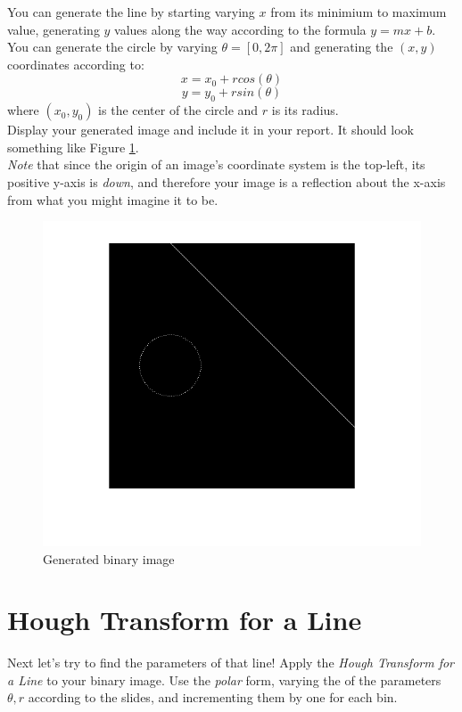 \documentclass[12pt]{article}
\begin{document}
\noindent
You can generate the line by starting varying $x$ from its minimium to maximum value, generating $y$ values along the way according to the formula $y=mx+b$.\\

\noindent
You can generate the circle by varying $\theta =[0,2\pi]$ and generating the $(x,y)$ coordinates according to:
$$x =x_0 + rcos\left(\theta\right)$$
$$y=y_0 + rsin\left(\theta\right)$$
where $(x_0,y_0)$ is the center of the circle and $r$ is its radius.\\

\noindent
Display your generated image and include it in your report.  It should look something like Figure \ref{fig1}.\\ 

\noindent
 \emph{Note} that since the origin of an image's coordinate system is the top-left, its positive y-axis is \emph{down}, and therefore your image is a reflection about the x-axis from what you might imagine it to be.

\begin{figure}[H]
\begin{center}
\includegraphics[width=13cm]{part2.png}
\caption{Generated binary image}
\label{fig1}
\end{center}
\end{figure}
 
\newpage
\section{Hough Transform for a Line}
Next let's try to find the parameters of that line!  Apply the \emph{Hough Transform for a Line} to your binary image.  Use the \emph{polar} form, varying the of the parameters $\theta, r$ according to the slides, and incrementing them by one for each bin.\\
\end{document}

